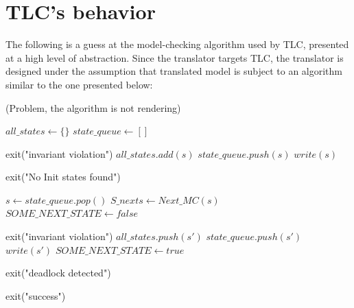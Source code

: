 \section{TLC's behavior}

The following is a guess at the model-checking algorithm used by TLC, presented at a high level of abstraction. Since the translator targets TLC, the translator is designed under the assumption that translated model is subject to an algorithm similar to the one presented below:


(Problem, the algorithm is not rendering)

\begin{algorithm}
\caption{Model-checking with TLC}

\begin{algorithmic}[1]

\STATE $all\_states \gets \{\}$
\STATE $state\_queue \gets []$

            \STATE exit("invariant violation")
        \ENDIF
        \STATE $all\_states.add(s)$
        \STATE $state\_queue.push(s)$
        \STATE $write(s)$
    \ENDIF
\ENDFOR

    \STATE exit("No Init states found")
\ENDIF

    \STATE $s \gets state\_queue.pop()$
    \STATE $S\_nexts \gets Next\_MC(s)$
    \STATE $SOME\_NEXT\_STATE \gets false$

                    \STATE exit("invariant violation")
                \ELSE
                    \STATE $all\_states.push(s')$
                    \STATE $state\_queue.push(s')$
                    \STATE $write(s')$
                \ENDIF
            \ENDIF
            \STATE $SOME\_NEXT\_STATE \gets true$
        \ENDIF
    \ENDFOR

        \STATE exit("deadlock detected")
    \ENDIF
\ENDWHILE

\STATE exit("success")


\end{algorithmic}
\end{algorithm}

